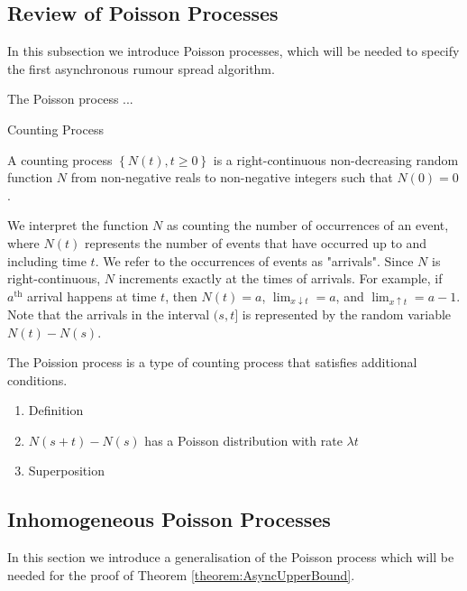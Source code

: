 \subsection{Review of Poisson Processes}

In this subsection we introduce Poisson processes, which will be needed to specify the first asynchronous rumour spread algorithm.

The Poisson process ...
\begin{definition}
	Counting Process

	\noindent
	A counting process $\left\{ N(t), t \geq 0 \right\}$ is a right-continuous non-decreasing random function $N$ from non-negative reals to non-negative integers such that $N(0) = 0$.
\end{definition}

We interpret the function $N$ as counting the number of occurrences of an event, where $N(t)$ represents the number of events that have occurred up to and including time $t$. We refer to the occurrences of events as "arrivals".  Since $N$ is right-continuous, $N$ increments exactly at the times of arrivals. For example, if $a^\text{th}$ arrival happens at time $t$, then $N(t) = a$, $\lim_{x \downarrow t} = a$, and $\lim_{x \uparrow t} = a - 1$. Note that the arrivals in the interval $(s, t]$ is represented by the random variable $N(t) - N(s)$. 

The Poission process is a type of counting process that satisfies additional conditions.  


\begin{enumerate}
	\item Definition
	\item $N(s + t) - N(s)$ has a Poisson distribution with rate $\lambda t$
	\item Superposition
\end{enumerate}

\subsection{Inhomogeneous Poisson Processes}

In this section we introduce a generalisation of the Poisson process which will be needed for the proof of Theorem \ref{theorem:AsyncUpperBound}.

